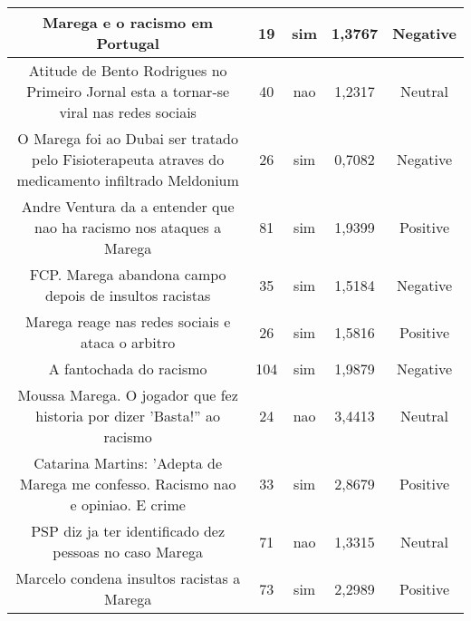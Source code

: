 \documentclass[11pt]{article}
\newlength\mylength
\begin{document}
\begin{center}
\begin{longtable}{||C{.40\mylength}||C{.20\mylength}||C{.20\mylength}||C{.30\mylength}||C{.20\mylength}||}
   Marega e o racismo em Portugal  & 19 & sim & 1,3767 & Negative \\  \hline
   Atitude de Bento Rodrigues no Primeiro Jornal esta a tornar-se viral nas redes sociais  & 40 & nao & 1,2317 & Neutral \\  \hline
   O Marega foi ao Dubai ser tratado pelo Fisioterapeuta atraves do medicamento infiltrado Meldonium  & 26 & sim & 0,7082 & Negative \\  \hline
   Andre Ventura da a entender que nao ha racismo nos ataques a Marega  & 81 & sim & 1,9399 & Positive \\  \hline
   FCP. Marega abandona campo depois de insultos racistas  & 35 & sim & 1,5184 & Negative \\  \hline
   Marega reage nas redes sociais e ataca o arbitro  & 26 & sim & 1,5816 & Positive \\  \hline
   A fantochada do racismo  & 104 & sim & 1,9879 & Negative \\  \hline
   Moussa Marega. O jogador que fez historia por dizer 'Basta!'' ao racismo  & 24 & nao & 3,4413 & Neutral \\  \hline
   Catarina Martins: 'Adepta de Marega me confesso. Racismo nao e opiniao. E crime  & 33 & sim & 2,8679 & Positive \\  \hline
   PSP diz ja ter identificado dez pessoas no caso Marega  & 71 & nao & 1,3315 & Neutral \\  \hline
   Marcelo condena insultos racistas a Marega  & 73 & sim & 2,2989 & Positive \\  \hline

\end{longtable}
\end{center}
\end{document}
